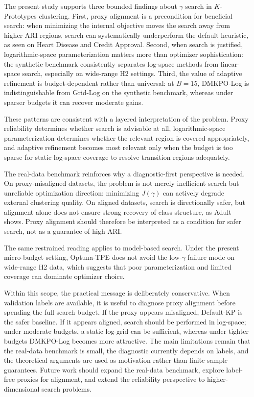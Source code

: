 \documentclass[10pt,lineno]{wlpeerj}
\begin{document}
The present study supports three bounded findings about $\gamma$ search in $K$-Prototypes clustering. First, proxy alignment is a precondition for beneficial search: when minimizing the internal objective moves the search away from higher-ARI regions, search can systematically underperform the default heuristic, as seen on Heart Disease and Credit Approval. Second, when search is justified, logarithmic-space parameterization matters more than optimizer sophistication: the synthetic benchmark consistently separates log-space methods from linear-space search, especially on wide-range H2 settings. Third, the value of adaptive refinement is budget-dependent rather than universal: at $B=15$, DMKPO-Log is indistinguishable from Grid-Log on the synthetic benchmark, whereas under sparser budgets it can recover moderate gains.

These patterns are consistent with a layered interpretation of the problem. Proxy reliability determines whether search is advisable at all, logarithmic-space parameterization determines whether the relevant region is covered appropriately, and adaptive refinement becomes most relevant only when the budget is too sparse for static log-space coverage to resolve transition regions adequately.

The real-data benchmark reinforces why a diagnostic-first perspective is needed. On proxy-misaligned datasets, the problem is not merely inefficient search but unreliable optimization direction: minimizing $J(\gamma)$ can actively degrade external clustering quality. On aligned datasets, search is directionally safer, but alignment alone does not ensure strong recovery of class structure, as Adult shows. Proxy alignment should therefore be interpreted as a condition for safer search, not as a guarantee of high ARI.

The same restrained reading applies to model-based search. Under the present micro-budget setting, Optuna-TPE does not avoid the low-$\gamma$ failure mode on wide-range H2 data, which suggests that poor parameterization and limited coverage can dominate optimizer choice.

Within this scope, the practical message is deliberately conservative. When validation labels are available, it is useful to diagnose proxy alignment before spending the full search budget. If the proxy appears misaligned, Default-KP is the safer baseline. If it appears aligned, search should be performed in log-space; under moderate budgets, a static log-grid can be sufficient, whereas under tighter budgets DMKPO-Log becomes more attractive. The main limitations remain that the real-data benchmark is small, the diagnostic currently depends on labels, and the theoretical arguments are used as motivation rather than finite-sample guarantees. Future work should expand the real-data benchmark, explore label-free proxies for alignment, and extend the reliability perspective to higher-dimensional search problems.
\end{document}
